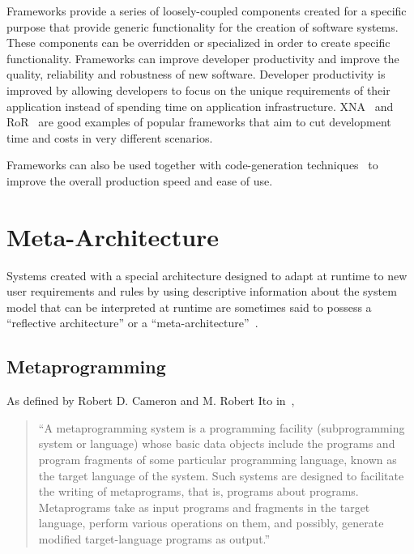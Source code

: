 Frameworks provide a series of loosely-coupled components created for a specific purpose that provide generic functionality for the creation of software systems. These components can be overridden or specialized in order to create specific functionality. Frameworks can improve developer productivity and improve the quality, reliability and robustness of new software.  Developer productivity is improved by allowing developers to focus on the unique requirements of their application instead of spending time on application infrastructure. XNA~\cite{xna} and RoR~\cite{rubyonrails} are good examples of popular frameworks that aim to cut development time and costs in very different scenarios.

Frameworks can also be used together with code-generation techniques~\cite{DH04, rails_generators} to improve the overall production speed and ease of use.


\section{Meta-Architecture}\label{sec:meta-architecture}

Systems created with a special architecture designed to adapt at runtime to new user requirements and rules by using descriptive information about the system model that can be interpreted at runtime are sometimes said to possess a ``reflective architecture'' or a ``meta-architecture''~\cite{YBJ01}.

\subsection{Metaprogramming}\label{sec:metaprogramming}

As defined by Robert D. Cameron and M. Robert Ito in~\cite{CI84},

\begin{quote}
 ``A metaprogramming system is a programming facility (subprogramming system or language) whose basic data objects include the programs and program fragments of some particular programming language, known as the target language of the system. Such systems are designed to facilitate the writing of metaprograms, that is, programs about programs. Metaprograms take as input programs and fragments in the target language, perform various operations on them, and possibly, generate modified target-language programs as output.''
\end{quote}

